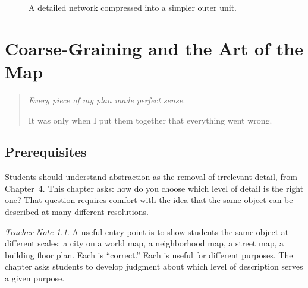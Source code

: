 \documentclass[11pt]{book}
\theoremstyle{definition}
\theoremstyle{remark}
\newtheorem{teachernote}{Teacher Note}[chapter]
\newenvironment{deepthought}
  {\begin{quote}\itshape}
  {\end{quote}}
\begin{document}
\begin{figure}[h]
\centering
{}
\caption{A detailed network compressed into a simpler outer unit.}
\end{figure}

\chapter{Coarse-Graining and the Art of the Map}

\begin{deepthought}
Every piece of my plan made perfect sense.

It was only when I put them together that everything went wrong.
\end{deepthought}

\section*{Prerequisites}

Students should understand abstraction as the removal of irrelevant
detail, from Chapter~4. This chapter asks: how do you choose which level
of detail is the right one? That question requires comfort with the idea
that the same object can be described at many different resolutions.

\begin{teachernote}
A useful entry point is to show students the same object at different
scales: a city on a world map, a neighborhood map, a street map, a
building floor plan. Each is ``correct.'' Each is useful for different
purposes. The chapter asks students to develop judgment about which
level of description serves a given purpose.
\end{teachernote}
\end{document}
